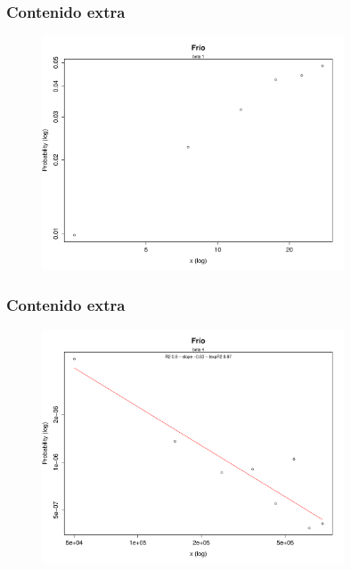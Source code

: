 \documentclass[serif,9pt, t]{beamer}
\begin{document}
\begin{frame}\frametitle{Contenido extra}
\begin{figure}
\centering
\includegraphics[width=0.8\textwidth]{extras/distribucion_strength_beta_1.pdf}
\end{figure}
\end{frame}

\begin{frame}\frametitle{Contenido extra}
\begin{figure}
\centering
\includegraphics[width=0.8\textwidth]{extras/distribucion_strength_beta_4.pdf}
\end{figure}
\end{frame}
\end{document}
